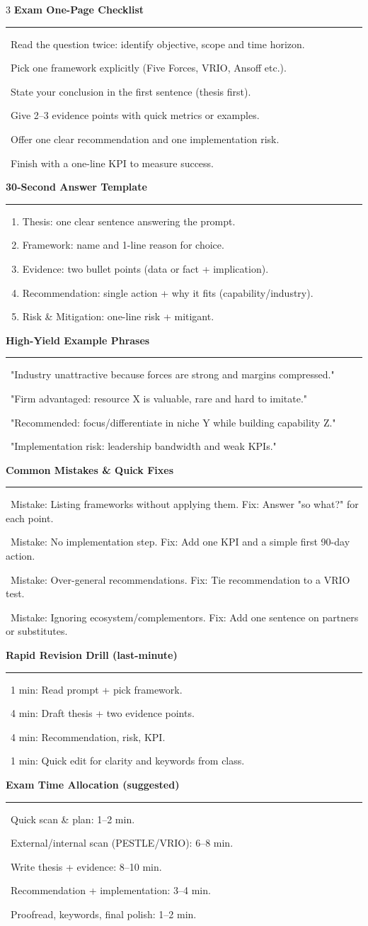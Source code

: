 \documentclass[7.6pt,letterpaper]{article}
\newcommand{\secbar}[1]{%
    \vspace{2pt}\noindent\textbf{#1}\par\vspace{1pt}\hrule\vspace{2pt}%
  }
\newcommand{\secbar}[1]{%
    \vspace{3pt}%
    \noindent\colorbox{navy}{\parbox{\dimexpr\linewidth-2\fboxsep}{%
      \fontsize{6.8pt}{8pt}\sffamily\bfseries\color{white}\strut\ #1\strut}}%
    \vspace{1pt}\par%
  }
\newcommand{\bul}[1]{\noindent{\color{mid}$\triangleright$}\ #1\par}
\begin{document}
\begin{multicols}{3}
\secbar{Exam One-Page Checklist}
\bul{Read the question twice: identify objective, scope and time horizon.}
\bul{Pick one framework explicitly (Five Forces, VRIO, Ansoff etc.).}
\bul{State your conclusion in the first sentence (thesis first).}
\bul{Give 2–3 evidence points with quick metrics or examples.}
\bul{Offer one clear recommendation and one implementation risk.}
\bul{Finish with a one-line KPI to measure success.}

\secbar{30‑Second Answer Template}
\begin{enumerate}
  \item Thesis: one clear sentence answering the prompt.\
  \item Framework: name and 1-line reason for choice.\
  \item Evidence: two bullet points (data or fact + implication).\
  \item Recommendation: single action + why it fits (capability/industry).\
  \item Risk & Mitigation: one-line risk + mitigant.\
\end{enumerate}

\secbar{High-Yield Example Phrases}
\bul{"Industry unattractive because forces are strong and margins compressed."}
\bul{"Firm advantaged: resource X is valuable, rare and hard to imitate."}
\bul{"Recommended: focus/differentiate in niche Y while building capability Z."}
\bul{"Implementation risk: leadership bandwidth and weak KPIs."}

\secbar{Common Mistakes \& Quick Fixes}
\bul{Mistake: Listing frameworks without applying them. \quad Fix: Answer "so what?" for each point.}
\bul{Mistake: No implementation step. \quad Fix: Add one KPI and a simple first 90-day action.}
\bul{Mistake: Over-general recommendations. \quad Fix: Tie recommendation to a VRIO test.}
\bul{Mistake: Ignoring ecosystem/complementors. \quad Fix: Add one sentence on partners or substitutes.}

\secbar{Rapid Revision Drill (last-minute)}
\bul{1 min: Read prompt + pick framework.}
\bul{4 min: Draft thesis + two evidence points.}
\bul{4 min: Recommendation, risk, KPI.}
\bul{1 min: Quick edit for clarity and keywords from class.}
\vspace{2pt}
\secbar{Exam Time Allocation (suggested)}
\bul{Quick scan & plan: 1--2 min.}
\bul{External/internal scan (PESTLE/VRIO): 6--8 min.}
\bul{Write thesis + evidence: 8--10 min.}
\bul{Recommendation + implementation: 3--4 min.}
\bul{Proofread, keywords, final polish: 1--2 min.}


\end{multicols}
\end{document}
